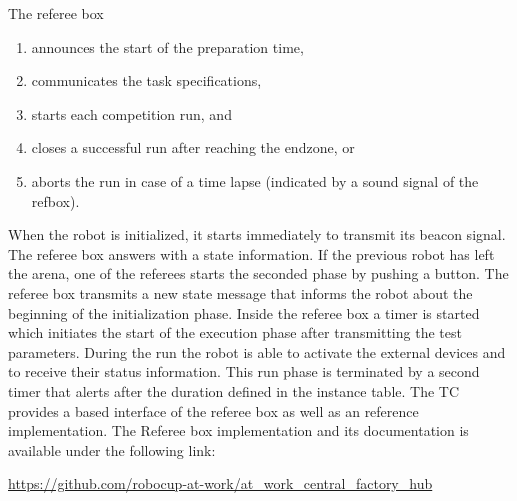 The referee box
\begin{enumerate}
  \item announces the start of the preparation time,
  \item communicates the task specifications,
  \item starts each competition run, and
  \item closes a successful run after reaching the endzone, or
  \item aborts the run in case of a time lapse (indicated by a sound signal of the refbox).
\end{enumerate}

When the robot is initialized, it starts immediately to transmit its beacon
signal. The referee box answers with a state information. If the previous robot
has left the arena, one of the referees starts the seconded phase by pushing a
button. The referee box transmits a new state message that informs the robot
about the beginning of the initialization phase. Inside the referee box a
timer is started which initiates the start of the execution phase after
transmitting the test parameters. During the run the robot is able to activate
the external devices and to receive their status information. This run phase is
terminated by a second timer that alerts after the duration defined in the
instance table.
%
% 
The TC provides a  based interface of the referee box as well as
an reference implementation.
The Referee box implementation and its documentation is available under the following link:
\begin{center}
\url{https://github.com/robocup-at-work/at_work_central_factory_hub}

\end{center}




